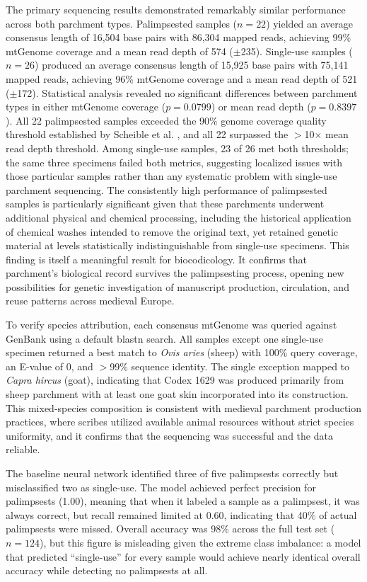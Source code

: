 \documentclass[final]{anthology-ch} %
\begin{document}
The primary sequencing results demonstrated remarkably similar performance across both parchment types. Palimpsested samples ($n = 22$) yielded an average consensus length of 16,504 base pairs with 86,304 mapped reads, achieving 99\% mtGenome coverage and a mean read depth of 574 ($\pm$235). Single-use samples ($n = 26$) produced an average consensus length of 15,925 base pairs with 75,141 mapped reads, achieving 96\% mtGenome coverage and a mean read depth of 521 ($\pm$172). Statistical analysis revealed no significant differences between parchment types in either mtGenome coverage ($p = 0.0799$) or mean read depth ($p = 0.8397$). All 22 palimpsested samples exceeded the 90\% genome coverage quality threshold established by Scheible et al. \cite{scheible2024development}, and all 22 surpassed the $>$10$\times$ mean read depth threshold. Among single-use samples, 23 of 26 met both thresholds; the same three specimens failed both metrics, suggesting localized issues with those particular samples rather than any systematic problem with single-use parchment sequencing. The consistently high performance of palimpsested samples is particularly significant given that these parchments underwent additional physical and chemical processing, including the historical application of chemical washes intended to remove the original text, yet retained genetic material at levels statistically indistinguishable from single-use specimens. This finding is itself a meaningful result for biocodicology. It confirms that parchment's biological record survives the palimpsesting process, opening new possibilities for genetic investigation of manuscript production, circulation, and reuse patterns across medieval Europe.

To verify species attribution, each consensus mtGenome was queried against GenBank using a default blastn search. All samples except one single-use specimen returned a best match to \textit{Ovis aries} (sheep) with 100\% query coverage, an E-value of 0, and $>$99\% sequence identity. The single exception mapped to \textit{Capra hircus} (goat), indicating that Codex 1629 was produced primarily from sheep parchment with at least one goat skin incorporated into its construction. This mixed-species composition is consistent with medieval parchment production practices, where scribes utilized available animal resources without strict species uniformity, and it confirms that the sequencing was successful and the data reliable.

The baseline neural network identified three of five palimpsests correctly but misclassified two as single-use. The model achieved perfect precision for palimpsests (1.00), meaning that when it labeled a sample as a palimpsest, it was always correct, but recall remained limited at 0.60, indicating that 40\% of actual palimpsests were missed. Overall accuracy was 98\% across the full test set ($n = 124$), but this figure is misleading given the extreme class imbalance: a model that predicted ``single-use'' for every sample would achieve nearly identical overall accuracy while detecting no palimpsests at all.
\end{document}
